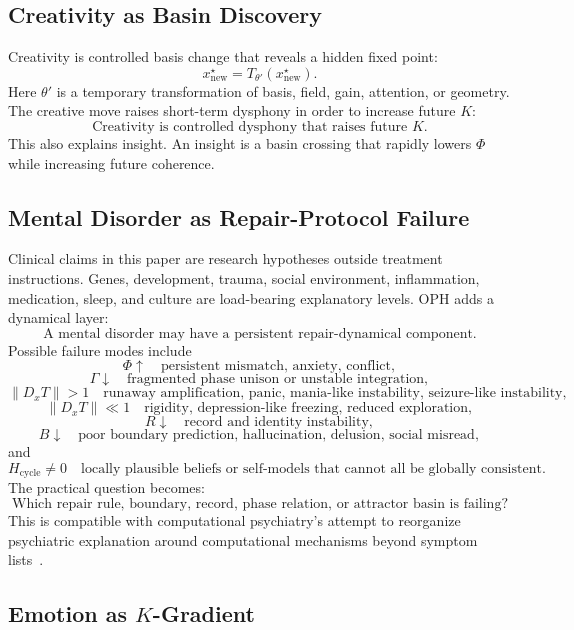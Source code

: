 \documentclass[11pt]{article}
\theoremstyle{remark}
\theoremstyle{plain}
\begin{document}
\subsection{Creativity as Basin Discovery}

Creativity is controlled basis change that reveals a hidden fixed point:
\[
x^\star_{\mathrm{new}}
=
T_{\theta'}(x^\star_{\mathrm{new}}).
\]
Here \(\theta'\) is a temporary transformation of basis, field, gain, attention, or geometry. The creative move raises short-term dysphony in order to increase future \(K\):
\[
\boxed{
\text{Creativity is controlled dysphony that raises future }K.
}
\]
This also explains insight. An insight is a basin crossing that rapidly lowers \(\Phi\) while increasing future coherence.

\subsection{Mental Disorder as Repair-Protocol Failure}

Clinical claims in this paper are research hypotheses outside treatment instructions. Genes, development, trauma, social environment, inflammation, medication, sleep, and culture are load-bearing explanatory levels. OPH adds a dynamical layer:
\[
\boxed{
\text{A mental disorder may have a persistent repair-dynamical component.}
}
\]
Possible failure modes include
\[
\Phi\uparrow
\quad\text{persistent mismatch, anxiety, conflict},
\]
\[
\Gamma\downarrow
\quad\text{fragmented phase unison or unstable integration},
\]
\[
\|D_xT\|>1
\quad\text{runaway amplification, panic, mania-like instability, seizure-like instability},
\]
\[
\|D_xT\|\ll1
\quad\text{rigidity, depression-like freezing, reduced exploration},
\]
\[
R\downarrow
\quad\text{record and identity instability},
\]
\[
B\downarrow
\quad\text{poor boundary prediction, hallucination, delusion, social misread},
\]
and
\[
H_{\mathrm{cycle}}\ne0
\quad\text{locally plausible beliefs or self-models that cannot all be globally consistent}.
\]
The practical question becomes:
\[
\boxed{
\text{Which repair rule, boundary, record, phase relation, or attractor basin is failing?}
}
\]
This is compatible with computational psychiatry's attempt to reorganize psychiatric explanation around computational mechanisms beyond symptom lists~\cite{ComputationalPsychiatryDisorder2024,Friston2023}.

\subsection[Emotion as K-Gradient]{Emotion as \(K\)-Gradient}
\end{document}
